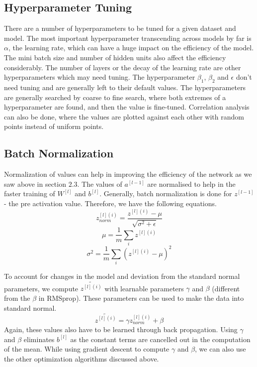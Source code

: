 \documentclass{article}
\begin{document}
\subsection{Hyperparameter Tuning}

There are a number of hyperparameters to be tuned for a given dataset and model. The most important hyperparameter transcending across models by far is $\alpha$, the learning rate, which can have a huge impact on the efficiency of the model. The mini batch size and number of hidden units also affect the efficiency considerably. The number of layers or the decay of the learning rate are other hyperparameters which may need tuning. The hyperparameter $\beta_1$, $\beta_2$ and $\epsilon$ don't need tuning and are generally left to their default values. The hyperparameters are generally searched by coarse to fine search, where both extremes of a hyperparameter are found, and then the value is fine-tuned. Correlation analysis can also be done, where the values are plotted against each other with random points instead of uniform points.

\subsection{Batch Normalization}

Normalization of values can help in improving the efficiency of the network as we saw above in section $2.3$. The values of $a^{[l-1]}$ are normalised to help in the faster training of $W^{[l]}$ and $b^{[l]}$. Generally, batch normalization is done for $z^{[l-1]}$ - the pre activation value. Therefore, we have the following equations.
$$z_{norm}^{[l](i)} = \frac{z^{[l](i)} - \mu}{\sqrt{\sigma^2 + \epsilon}}$$
$$\mu = \frac{1}{m} \sum_{i} z^{[l](i)}$$
$$\sigma^2 = \frac{1}{m} \sum_{i} (z^{[l](i)}-\mu)^2$$

To account for changes in the model and deviation from the standard normal parameters, we compute $\tilde{z^{[l](i)}}$ with learnable parameters $\gamma$ and $\beta$ (different from the $\beta$ in RMSprop). These parameters can be used to make the data into standard normal. 
$$\tilde{z^{[l](i)}} = \gamma z_{norm}^{[l](i)} + \beta$$
Again, these values also have to be learned through back propagation. Using $\gamma$ and $\beta$ eliminates $b^{[l]}$ as the constant terms are cancelled out in the computation of the mean. While using gradient descent to compute $\gamma$ and $\beta$, we can also use the other optimization algorithms discussed above. 
\end{document}
